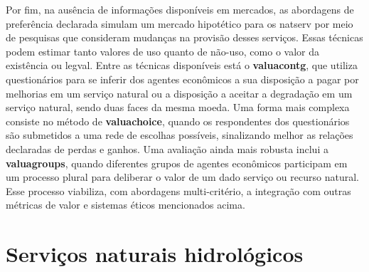 \documentclass[./main.tex]{subfiles}
\begin{document}
\par Por fim, na ausência de informações disponíveis em mercados, as abordagens de preferência declarada simulam um mercado hipotético para os \gls{natserv} por meio de pesquisas que consideram mudanças na provisão desses serviços. Essas técnicas podem estimar tanto valores de uso quanto de não-uso, como o valor da existência ou \gls{legval}. Entre as técnicas disponíveis está o \textbf{\gls{valuacontg}}, que utiliza questionários para se inferir dos agentes econômicos a sua disposição a pagar por melhorias em um serviço natural ou a disposição a aceitar a degradação em um serviço natural, sendo duas faces da mesma moeda. Uma forma mais complexa consiste no método de \textbf{\gls{valuachoice}}, quando os respondentes dos questionários são submetidos a uma rede de escolhas possíveis, sinalizando melhor as relações declaradas de perdas e ganhos. Uma avaliação ainda mais robusta inclui a \textbf{\gls{valuagroups}}, quando diferentes grupos de agentes econômicos participam em um processo plural para deliberar o valor de um dado serviço ou recurso natural. Esse processo viabiliza, com abordagens multi-critério, a integração com outras métricas de valor e sistemas éticos mencionados acima.

\section{Serviços naturais hidrológicos} \label{chap:ecoeco:watersheds}
\end{document}
